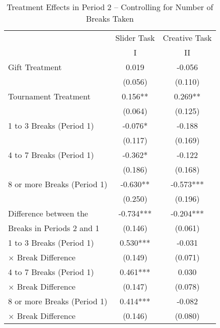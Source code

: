 
\begin{table}[H]%
\caption{Treatment Effects in Period 2 -- Controlling for Number of Breaks Taken}
\begin{center}%
{\small\renewcommand{\arraystretch}{0.7}%
\begin{tabular}{lcc}
\hline\hline\noalign{\smallskip}
            &      Slider Task   &    Creative Task   \\
						&          I         &       II           \\
\hline\noalign{\smallskip}
Gift Treatment&       0.019   &      -0.056   \\
            &     (0.056)   &     (0.110)   \\[2mm]
Tournament Treatment&       0.156** &       0.269** \\
            &     (0.064)   &     (0.125)   \\[2mm]
1 to 3 Breaks (Period 1)    &      -0.076*  &      -0.188  \\
            &     (0.117)   &     (0.169)   \\[2mm]
4 to 7 Breaks (Period 1)    &      -0.362*&      -0.122   \\
            &     (0.186)   &     (0.168)   \\[2mm]
8 or more Breaks (Period 1) &      -0.630**&      -0.573***\\
            &     (0.250)   &     (0.196)   \\[2mm]
Difference between the      &      -0.734***&      -0.204***\\
 Breaks in Periods 2 and 1  &     (0.146)   &     (0.061)   \\[2mm]
1 to 3 Breaks (Period 1)    &       0.530***  &      -0.031   \\
   $\times$  Break Difference           &     (0.149)   &     (0.071)   \\[2mm]
4 to 7 Breaks (Period 1)    &       0.461***   &       0.030   \\
   $\times$  Break Difference           &     (0.147)   &     (0.078)   \\[2mm]
8 or more Breaks (Period 1) &       0.414***   &      -0.082   \\
   $\times$  Break Difference           &     (0.146)   &     (0.080)   \\[2mm]

\end{tabular}}
\end{center}
\end{table}

